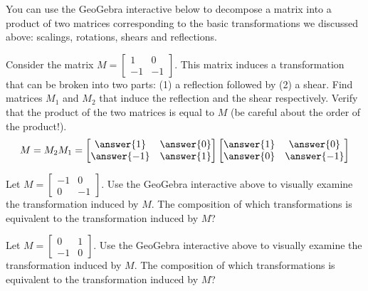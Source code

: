 \documentclass{ximera}
\begin{document}
\begin{exploration}\label{exp:matrixComp}
You can use the GeoGebra interactive below to decompose a matrix into a product of two matrices corresponding to the basic transformations we discussed above: scalings, rotations, shears and reflections.

Consider the matrix $M=\begin{bmatrix} 1 & 0\\-1 & -1\end{bmatrix}$.  This matrix induces a transformation that can be broken into two parts: (1) a reflection followed by (2) a shear.  Find matrices $M_1$ and $M_2$ that induce the reflection and the shear respectively.  Verify that the product of the two matrices is equal to $M$ (be careful about the order of the product!).
$$M=M_2M_1=\begin{bmatrix}\answer{1}&\answer{0}\\\answer{-1}&\answer{1}\end{bmatrix}\begin{bmatrix}\answer{1}&\answer{0}\\\answer{0}&\answer{-1}\end{bmatrix}$$
\begin{center}
\end{center}
Let  $M=\begin{bmatrix}-1&0\\0&-1\end{bmatrix}$.  Use the GeoGebra interactive above to visually examine the transformation induced by $M$.  The composition of which transformations is equivalent to the transformation induced by $M$? 
\begin{multipleChoice}  
\end{multipleChoice} 

Let $M=\begin{bmatrix}0&1\\-1&0\end{bmatrix}$.  Use the GeoGebra interactive above to visually examine the transformation induced by $M$.
The composition of which transformations is equivalent to the transformation induced by $M$? 
\begin{multipleChoice}  
\end{multipleChoice} 
\end{exploration}
\end{document}
